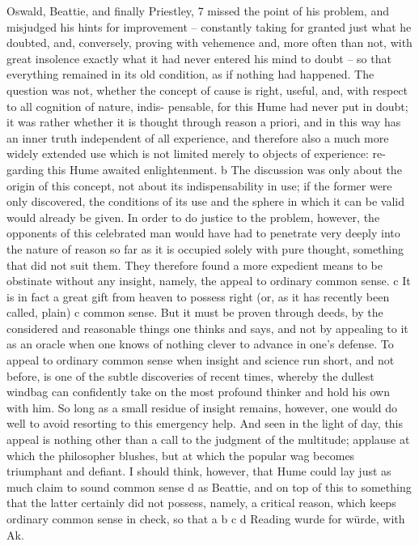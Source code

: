 Oswald, Beattie, and ﬁnally Priestley, 7 missed the point of his problem, and
misjudged his hints for improvement – constantly taking for granted just
what he doubted, and, conversely, proving with vehemence and, more
often than not, with great insolence exactly what it had never entered
his mind to doubt – so that everything remained in its old condition, as
if nothing had happened. The question was not, whether the concept of
cause is right, useful, and, with respect to all cognition of nature, indis-
pensable, for this Hume had never put in doubt; it was rather whether
it is thought through reason a priori, and in this way has an inner truth
independent of all experience, and therefore also a much more widely
extended use which is not limited merely to objects of experience: re-
garding this Hume awaited enlightenment. b The discussion was only
about the origin of this concept, not about its indispensability in use; if
the former were only discovered, the conditions of its use and the sphere
in which it can be valid would already be given.
In order to do justice to the problem, however, the opponents of this
celebrated man would have had to penetrate very deeply into the nature
of reason so far as it is occupied solely with pure thought, something
that did not suit them. They therefore found a more expedient means to
be obstinate without any insight, namely, the appeal to ordinary common
sense. c It is in fact a great gift from heaven to possess right (or, as it
has recently been called, plain) c common sense. But it must be proven
through deeds, by the considered and reasonable things one thinks and
says, and not by appealing to it as an oracle when one knows of nothing
clever to advance in one’s defense. To appeal to ordinary common sense
when insight and science run short, and not before, is one of the subtle
discoveries of recent times, whereby the dullest windbag can conﬁdently
take on the most profound thinker and hold his own with him. So long
as a small residue of insight remains, however, one would do well to
avoid resorting to this emergency help. And seen in the light of day,
this appeal is nothing other than a call to the judgment of the multitude;
applause at which the philosopher blushes, but at which the popular wag
becomes triumphant and deﬁant. I should think, however, that Hume
could lay just as much claim to sound common sense d as Beattie, and on
top of this to something that the latter certainly did not possess, namely,
a critical reason, which keeps ordinary common sense in check, so that
a
b
c
d
Reading wurde for würde, with Ak.
